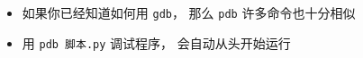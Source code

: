 
\begin{issues}
\issueDraft
\end{issues}

\begin{itemize}
\item 如果你已经知道如何用 \verb|gdb|， 那么 \verb|pdb| 许多命令也十分相似
\item 用 \verb|pdb 脚本.py| 调试程序， 会自动从头开始运行
\end{itemize}
